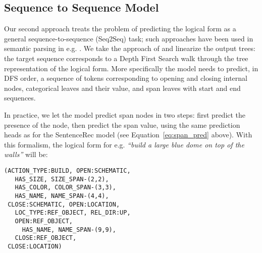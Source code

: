 \subsection{Sequence to Sequence Model}

Our second approach treats the problem of predicting the logical form as a general sequence-to-sequence (Seq2Seq) task; such approaches have been used in semantic parsing in e.g. \citep{jia2016data, wang2018transfer}. We take the approach of \citep{jia2016data} and linearize the output trees:
the target sequence corresponds to a Depth First Search walk through the tree representation of the logical form. More specifically the model needs to predict, in DFS order, a sequence of tokens corresponding to opening and closing internal nodes, categorical leaves and their value, and span leaves with start and end sequences.  
\begin{comment}
\begin{itemize}
\item opening of internal nodes, the corresponding sub-tree, then closing the node: \\ \textsc{open:location}, \ldots, \textsc{close:location}
\item categorical leaves along with their value: \\
\textsc{relative\_dir:up} or \textsc{action\_type:build}
\item span leaves, with start and end indexes:\\
\textsc{has\_size}-(1, 2) $\leftarrow$ \emph{make} {\bf{very large}} \emph{doors}
\end{itemize}
\end{comment}
In practice, we let the model predict span nodes in two steps: first predict the presence of the node, then predict the span value, using the same prediction heads as for the SentenceRec model (see Equation~\ref{eq:span_pred} above). With this formalism, the logical form for e.g. {\emph{``build a large blue dome on top of the walls''}} will be:

\begin{footnotesize}
\begin{verbatim}
(ACTION_TYPE:BUILD, OPEN:SCHEMATIC,
   HAS_SIZE, SIZE_SPAN-(2,2),
   HAS_COLOR, COLOR_SPAN-(3,3),
   HAS_NAME, NAME_SPAN-(4,4),
 CLOSE:SCHEMATIC, OPEN:LOCATION,
   LOC_TYPE:REF_OBJECT, REL_DIR:UP,
   OPEN:REF_OBJECT,
     HAS_NAME, NAME_SPAN-(9,9),
   CLOSE:REF_OBJECT,
 CLOSE:LOCATION)
\end{verbatim}
\end{footnotesize}

